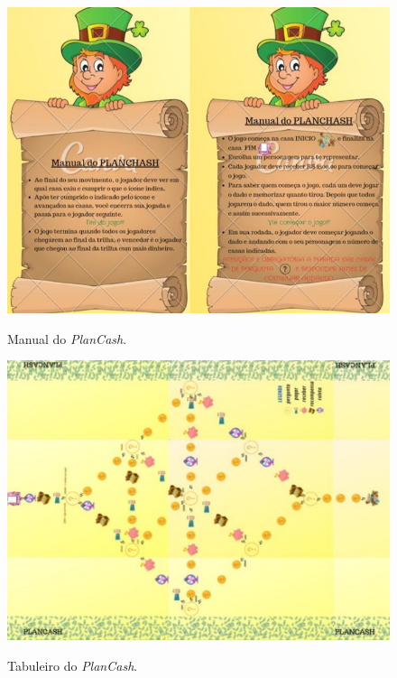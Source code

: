 \begin{figure}[ht]
	\centering
	\caption{Manual do \textit{PlanCash}.}
	\includegraphics[scale=0.5]{Textuais/Pictures/Plancash-1.png}
	\label{fig:plancash-1}
\end{figure}

\begin{figure}[ht]
	\centering
	\caption{Tabuleiro do \textit{PlanCash}.}
	\includegraphics[scale=0.5]{Textuais/Pictures/Plancash-2.png}
	\label{fig:plancash-2}
\end{figure}

\newpage


